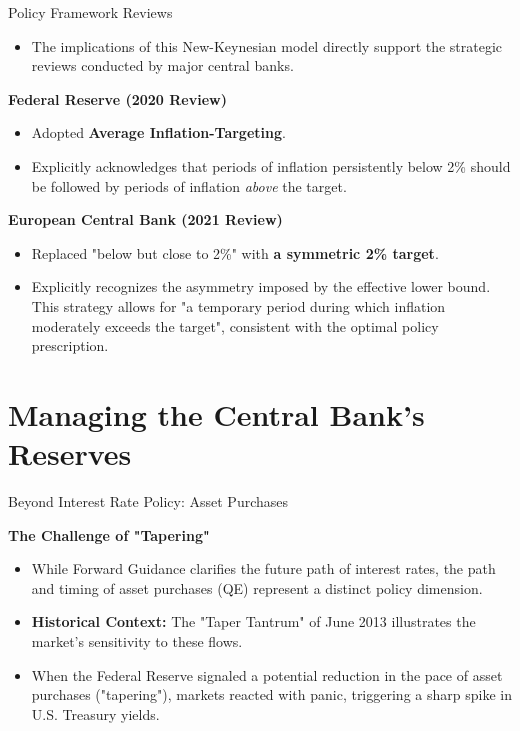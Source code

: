 \documentclass[11pt,aspectratio=169]{beamer}
\begin{document}
\begin{frame}{Policy Framework Reviews}
\small
\begin{itemize}
    \item The implications of this New-Keynesian model directly support the strategic reviews conducted by major central banks.
\end{itemize}

\vspace{0.2cm}

\textbf{Federal Reserve (2020 Review)}
\begin{itemize}
    \item Adopted \textbf{Average Inflation-Targeting}.
    \item Explicitly acknowledges that periods of inflation persistently below 2\% should be followed by periods of inflation \textit{above} the target.
\end{itemize}

\vspace{0.2cm}

\textbf{European Central Bank  (2021 Review)}
\begin{itemize}
    \item Replaced "below but close to 2\%" with \textbf{a symmetric 2\% target}.
    \item Explicitly recognizes the asymmetry imposed by the effective lower bound. This strategy allows for "a temporary period during which inflation moderately exceeds the target", consistent with the optimal policy prescription.
\end{itemize}
\end{frame}

\section{Managing the Central Bank's Reserves}
\label{CH-Reserves}

\begin{frame}{Beyond Interest Rate Policy: Asset Purchases}
\small

\textbf{The Challenge of "Tapering"}
\begin{itemize}
    \item While Forward Guidance clarifies the future path of interest rates, the path and timing of asset purchases (QE) represent a distinct policy dimension.
    \item \textbf{Historical Context:} The "Taper Tantrum" of June 2013 illustrates the market's sensitivity to these flows.
    \item When the Federal Reserve signaled a potential reduction in the pace of asset purchases ("tapering"), markets reacted with panic, triggering a sharp spike in U.S. Treasury yields.
\end{itemize}
\end{frame}
\end{document}
